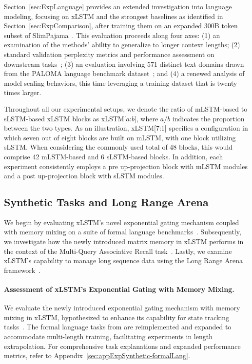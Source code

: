 Section~\ref{sec:ExpLanguage} provides an extended investigation into language modeling, focusing on xLSTM and the strongest baselines as identified in Section~\ref{sec:ExpComparison}, after training them on an expanded 300B token subset of SlimPajama~\citep{Soboleva:23}. This evaluation proceeds along four axes: (1) an examination of the methods’ ability to generalize to longer context lengths; (2) standard validation perplexity metrics and performance assessment on downstream tasks~\citep{Sutawika:24}; (3) an evaluation involving 571 distinct text domains drawn from the PALOMA language benchmark dataset~\citep{Magnusson:23arxivshort}; and (4) a renewed analysis of model scaling behaviors, this time leveraging a training dataset that is twenty times larger.

\label{sec:xlstm_blocks_notation}
Throughout all our experimental setups, we denote the ratio of mLSTM-based to sLSTM-based xLSTM blocks as xLSTM[$a$:$b$], where $a/b$ indicates the proportion between the two types. As an illustration, xLSTM[7:1] specifies a configuration in which seven out of eight blocks are built on mLSTM, with one block utilizing sLSTM. When considering the commonly used total of 48 blocks, this would comprise 42 mLSTM-based and 6 sLSTM-based blocks. In addition, each experiment consistently employs a pre up-projection block with mLSTM modules and a post up-projection block with sLSTM modules.

\subsection{Synthetic Tasks and Long Range Arena}
\label{sec:ExpSyntethic}
We begin by evaluating xLSTM’s novel exponential gating mechanism coupled with memory mixing on a suite of formal language benchmarks~\citep{Deletang:23}. Subsequently, we investigate how the newly introduced matrix memory in xLSTM performs in the context of the Multi-Query Associative Recall task~\citep{Arora:23arxiv}. Lastly, we examine xLSTM’s capability to manage long sequence data using the Long Range Arena framework~\citep{Tay:21}.

\paragraph{Assessment of xLSTM’s Exponential Gating with Memory Mixing.} We evaluate the newly introduced exponential gating mechanism with memory mixing in xLSTM, hypothesized to enhance its capability for state tracking tasks~\citep{Merrill:24, Merrill:23}. The formal language tasks from \citet{Deletang:23} are reimplemented and expanded to accommodate multi-length training, facilitating experiments in length extrapolation. For comprehensive task explanations and expanded performance metrics, refer to Appendix~\ref{sec:appExpSynthetic-formalLang}. 

